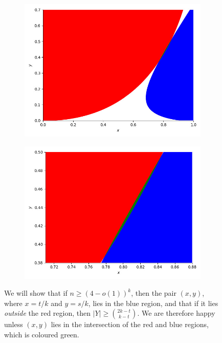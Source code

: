 \documentclass[12pt,reqno]{amsart}
\theoremstyle{definition}
\theoremstyle{remark}
\renewcommand{\ge}{\geqslant}
\begin{document}
\begin{figure}[h]
  \centering
  \begin{subfigure}[b]{0.46\textwidth}
    \includegraphics[width=\textwidth]{Figure_ESz.jpeg}
  \end{subfigure}
  \hspace{0.5cm}
  \begin{subfigure}[b]{0.46\textwidth}
    \includegraphics[width=\textwidth]{Figure_ESz_zoomed.jpeg}
  \end{subfigure}
   \vskip-0.2cm
\caption{We will show that if $n \ge (4 - o(1))^k$, then the pair $(x,y)$, where $x = t/k$ and $y = s/k$, lies in the blue region, and that if it lies \emph{outside} the red region, then $|Y| \ge {2k - t \choose k-t}$. We are therefore happy unless $(x,y)$ lies in the intersection of the red and blue regions, which is coloured green.}
\label{fig:ESz}
\end{figure}
\end{document}
